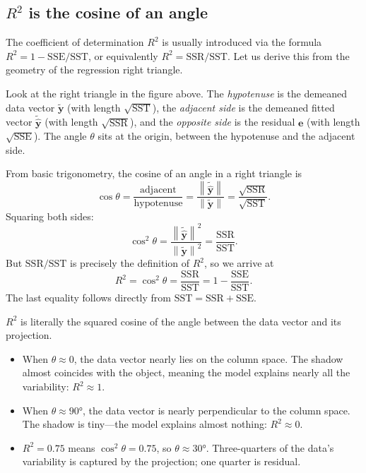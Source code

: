 \documentclass[11pt,a4paper]{article}
\theoremstyle{plain}
\theoremstyle{definition}
\newcommand{\yhat}{\hat{\bm{y}}}
\newcommand{\by}{\bm{y}}
\newcommand{\be}{\bm{e}}
\newcommand{\norm}[1]{\left\lVert #1 \right\rVert}
\begin{document}
\subsection{$R^2$ is the cosine of an angle}\label{sec:r2}

The coefficient of determination $R^2$ is usually introduced via the formula
$R^2 = 1 - \text{SSE}/\text{SST}$, or equivalently
$R^2 = \text{SSR}/\text{SST}$.
Let us derive this from the geometry of the regression right triangle.

Look at the right triangle in the figure above.
The \emph{hypotenuse} is the demeaned data vector $\tilde{\by}$ (with length $\sqrt{\text{SST}}$),
the \emph{adjacent side} is the demeaned fitted vector $\tilde{\yhat}$ (with length $\sqrt{\text{SSR}}$),
and the \emph{opposite side} is the residual $\be$ (with length $\sqrt{\text{SSE}}$).
The angle $\theta$ sits at the origin, between the hypotenuse and the adjacent side.

From basic trigonometry, the cosine of an angle in a right triangle is
\[
  \cos\theta = \frac{\text{adjacent}}{\text{hypotenuse}}
  = \frac{\norm{\tilde{\yhat}}}{\norm{\tilde{\by}}}
  = \frac{\sqrt{\text{SSR}}}{\sqrt{\text{SST}}}.
\]
Squaring both sides:
\[
  \cos^2\theta
  = \frac{\norm{\tilde{\yhat}}^2}{\norm{\tilde{\by}}^2}
  = \frac{\text{SSR}}{\text{SST}}.
\]
But $\text{SSR}/\text{SST}$ is precisely the definition of $R^2$, so we arrive at
\begin{equation}\label{eq:r2}
  \boxed{R^2 = \cos^2\theta = \frac{\text{SSR}}{\text{SST}}
  = 1 - \frac{\text{SSE}}{\text{SST}}.}
\end{equation}
The last equality follows directly from $\text{SST} = \text{SSR} + \text{SSE}$.

\begin{keyinsight}
$R^2$ is literally the squared cosine of the angle between the data vector
and its projection.
\begin{itemize}[nosep]
  \item When $\theta\approx 0$, the data vector nearly lies on the column space.
    The shadow almost coincides with the object, meaning the model explains
    nearly all the variability: $R^2\approx 1$.
  \item When $\theta\approx 90°$, the data vector is nearly perpendicular to the
    column space.  The shadow is tiny---the model explains almost nothing:
    $R^2\approx 0$.
  \item $R^2 = 0.75$ means $\cos^2\theta = 0.75$, so $\theta\approx 30°$.
    Three-quarters of the data's variability is captured by the
    projection; one quarter is residual.
\end{itemize}
\end{keyinsight}
\end{document}
